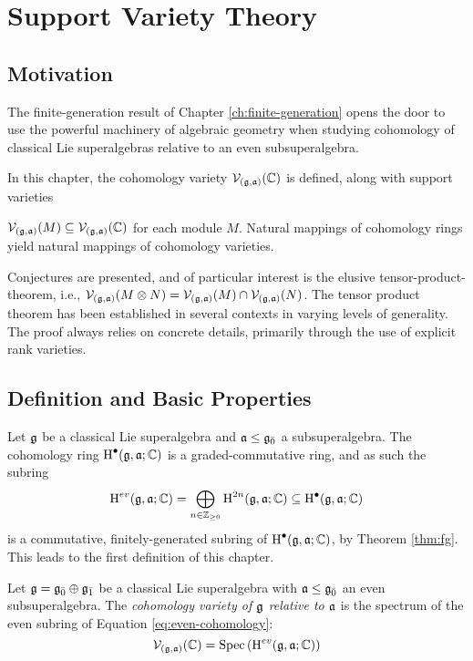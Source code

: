 \chapter{Support Variety Theory}
\label{ch:support}

\section{Motivation}
\label{sec:supp-motivation}

The finite-generation result of Chapter \ref{ch:finite-generation} opens the door to use the powerful machinery of algebraic geometry when studying cohomology of classical Lie superalgebras relative to an even subsuperalgebra.

In this chapter, the cohomology variety $\mathcal{V}_{(\mathfrak{g},\mathfrak{a})}(\mathbb{C})$ is defined, along with support varieties

$\mathcal{V}_{(\mathfrak{g},\mathfrak{a})}(M) \subseteq \mathcal{V}_{(\mathfrak{g},\mathfrak{a})}(\mathbb{C})$ for each module $M$. Natural mappings of cohomology rings yield natural mappings of cohomology varieties.

Conjectures are presented, and of particular interest is the elusive tensor-product-theorem, i.e., $\mathcal{V}_{(\mathfrak{g},\mathfrak{a})}(M \otimes N) = \mathcal{V}_{(\mathfrak{g},\mathfrak{a})}(M) \cap \mathcal{V}_{(\mathfrak{g},\mathfrak{a})}(N)$. The tensor product theorem has been established in several contexts in varying levels of generality. The proof always relies on concrete details, primarily through the use of explicit rank varieties. 

\section{Definition and Basic Properties}
\label{sec:def-sv}

Let $\mathfrak{g}$ be a classical Lie superalgebra and $\mathfrak{a} \leq {\mathfrak{g}}_{\bar{0}}$ a subsuperalgebra. The cohomology ring $\operatorname{H}^\bullet(\mathfrak{g},\mathfrak{a};\mathbb{C})$ is a graded-commutative ring, and as such the subring
\begin{equation} \label{eq:even-cohomology}
  \operatorname{H}^{ev}(\mathfrak{g},\mathfrak{a};\mathbb{C}) = \bigoplus_{n \in \mathbb{Z}_{\geq 0}} \operatorname{H}^{2n}(\mathfrak{g},\mathfrak{a};\mathbb{C}) \subseteq \operatorname{H}^\bullet(\mathfrak{g},\mathfrak{a};\mathbb{C})
\end{equation}
is a commutative, finitely-generated subring of $\operatorname{H}^\bullet(\mathfrak{g},\mathfrak{a};\mathbb{C})$, by Theorem \ref{thm:fg}. This leads to the first definition of this chapter.


\begin{definition}
  Let $\mathfrak{g} = {\mathfrak{g}}_{\bar{0}} \oplus {\mathfrak{g}}_{\bar{1}}$ be a classical Lie superalgebra with $\mathfrak{a} \leq {\mathfrak{g}}_{\bar{0}}$ an even subsuperalgebra. The \emph{cohomology variety of $\mathfrak{g}$ relative to $\mathfrak{a}$} is the spectrum of the even subring of Equation \ref{eq:even-cohomology}:
  \[
    \mathcal{V}_{(\mathfrak{g},\mathfrak{a})}(\mathbb{C}) = \operatorname{Spec}\left( \operatorname{H}^{ev}(\mathfrak{g},\mathfrak{a};\mathbb{C})\right)
  \]
\end{definition}


